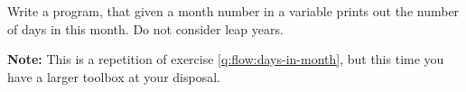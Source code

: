 Write a program, that given a month number in a variable prints out the number of days in this month. Do not consider leap years.

\textbf{Note:} This is a repetition of exercise \ref{q:flow:days-in-month}, but this time you have a larger toolbox at your disposal.
